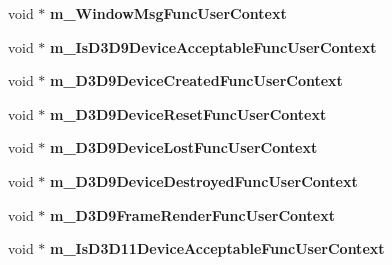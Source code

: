 \begin{DoxyCompactItemize}
\item 
\hypertarget{struct_d_x_u_t_state_1_1_s_t_a_t_e_ae847d206ac01990e7240ca915817a41f}{void $\ast$ {\bfseries m\+\_\+\+Window\+Msg\+Func\+User\+Context}}\label{struct_d_x_u_t_state_1_1_s_t_a_t_e_ae847d206ac01990e7240ca915817a41f}

\item 
\hypertarget{struct_d_x_u_t_state_1_1_s_t_a_t_e_a8c9ca86aa6929ead883ba8a867d94a5f}{void $\ast$ {\bfseries m\+\_\+\+Is\+D3\+D9\+Device\+Acceptable\+Func\+User\+Context}}\label{struct_d_x_u_t_state_1_1_s_t_a_t_e_a8c9ca86aa6929ead883ba8a867d94a5f}

\item 
\hypertarget{struct_d_x_u_t_state_1_1_s_t_a_t_e_ade4fc8b46409e634e7500af02bb3a9f8}{void $\ast$ {\bfseries m\+\_\+\+D3\+D9\+Device\+Created\+Func\+User\+Context}}\label{struct_d_x_u_t_state_1_1_s_t_a_t_e_ade4fc8b46409e634e7500af02bb3a9f8}

\item 
\hypertarget{struct_d_x_u_t_state_1_1_s_t_a_t_e_a4cd891a4359878cf7fc1f267dd831f63}{void $\ast$ {\bfseries m\+\_\+\+D3\+D9\+Device\+Reset\+Func\+User\+Context}}\label{struct_d_x_u_t_state_1_1_s_t_a_t_e_a4cd891a4359878cf7fc1f267dd831f63}

\item 
\hypertarget{struct_d_x_u_t_state_1_1_s_t_a_t_e_ad045aeef827f2d89251d8d3ab9d49588}{void $\ast$ {\bfseries m\+\_\+\+D3\+D9\+Device\+Lost\+Func\+User\+Context}}\label{struct_d_x_u_t_state_1_1_s_t_a_t_e_ad045aeef827f2d89251d8d3ab9d49588}

\item 
\hypertarget{struct_d_x_u_t_state_1_1_s_t_a_t_e_af8f821963dc172d9d637ef8494d636fe}{void $\ast$ {\bfseries m\+\_\+\+D3\+D9\+Device\+Destroyed\+Func\+User\+Context}}\label{struct_d_x_u_t_state_1_1_s_t_a_t_e_af8f821963dc172d9d637ef8494d636fe}

\item 
\hypertarget{struct_d_x_u_t_state_1_1_s_t_a_t_e_a7fa0f46124c0ce8bd8c88e0ee1b3b33c}{void $\ast$ {\bfseries m\+\_\+\+D3\+D9\+Frame\+Render\+Func\+User\+Context}}\label{struct_d_x_u_t_state_1_1_s_t_a_t_e_a7fa0f46124c0ce8bd8c88e0ee1b3b33c}

\item 
\hypertarget{struct_d_x_u_t_state_1_1_s_t_a_t_e_afcba784d7ef072cdd12d63cf1882b997}{void $\ast$ {\bfseries m\+\_\+\+Is\+D3\+D11\+Device\+Acceptable\+Func\+User\+Context}}\label{struct_d_x_u_t_state_1_1_s_t_a_t_e_afcba784d7ef072cdd12d63cf1882b997}


\end{DoxyCompactItemize}
